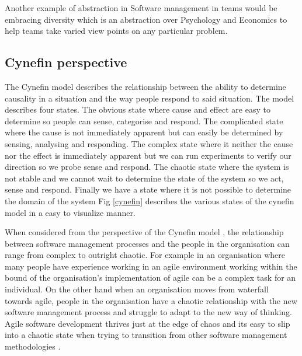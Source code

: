 \documentclass[12pt,conference]{IEEEtran}
\begin{document}
Another example of abstraction in Software management in teams would be embracing diversity which is an abstraction over Psychology and Economics to help teams take varied view points on any particular problem. 

\subsection*{Cynefin perspective}

The Cynefin model describes the relationship between the ability to determine causality in a situation and the way people respond to said situation. The model describes four states. The obvious state where cause and effect are easy to determine so people can sense, categorise and respond. The complicated state where the cause is not immediately apparent but can easily be determined by sensing, analysing and responding. The complex state where it neither the cause nor the effect is immediately apparent but we can run experiments to verify our direction so we probe sense and respond. The chaotic state where the system is not stable and we cannot wait to determine the state of the system so we act, sense and respond. Finally we have a state where it is not possible to determine the domain of the system
Fig \ref{cynefin} describes the various states of the cynefin model in a easy to visualize manner.

When considered from the perspective of the Cynefin model \cite{snowden_cynefin_????}, the relationship between software management processes and the people in the organisation can range from complex to outright chaotic. For example in an organisation where many people have experience working in an agile environment working within the bound of the organisation's implementation of agile can be a complex task for an individual. On the other hand when an organisation moves from waterfall towards agile, people in the organisation have a chaotic relationship with the new software management process and struggle to adapt to the new way of thinking. Agile software development thrives just at the edge of chaos and its easy to slip into a chaotic state when trying to transition from other software management methodologies \cite{kautz_just_2008}. 
\end{document}
